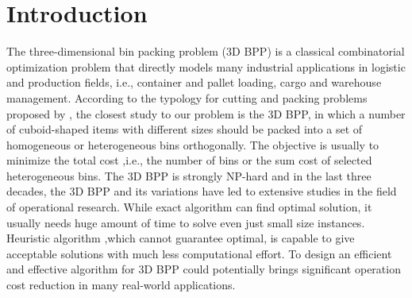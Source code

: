 \section{Introduction}
\label{sec:intro}

The three-dimensional bin packing problem (3D BPP) is a classical combinatorial optimization problem that directly models many industrial applications in logistic and production fields, i.e., container and pallet loading, cargo and warehouse management. %
According to the typology for cutting and packing problems proposed by \cite{wascher2007improved}, the closest study to our problem is the 3D BPP, in which a number of cuboid-shaped items with different sizes should be packed into a set of homogeneous or heterogeneous bins orthogonally. The objective is usually to minimize the total cost ,i.e., the number of bins or the sum cost of selected heterogeneous bins. The 3D BPP is strongly NP-hard \cite{martello2000three} and in the last three decades, the 3D BPP and its variations have led to extensive studies in the field of operational research. %
While exact algorithm can find optimal solution, it usually needs huge amount of time to solve even just small size instances. Heuristic algorithm ,which cannot guarantee optimal, is capable to give acceptable solutions with much less computational effort. 
To design an efficient and effective algorithm for 3D BPP could potentially brings significant operation cost reduction in many real-world applications.

